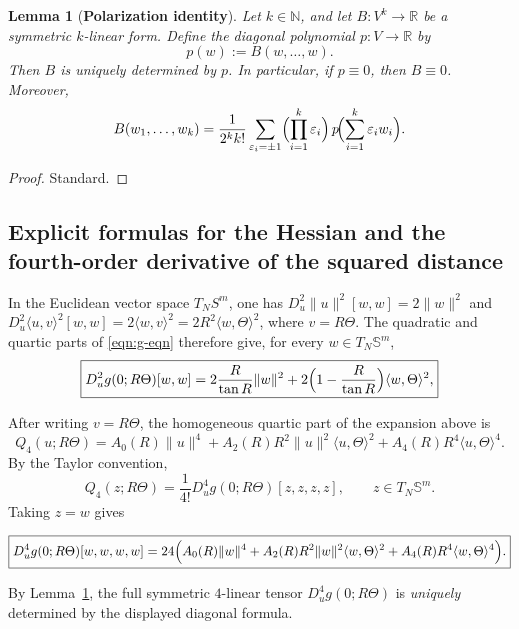\documentclass{amsart}
\newtheorem{lemma}[theorem]{Lemma}
\theoremstyle{definition}
\theoremstyle{remark}
\newcommand\0{\boldsymbol{0}}
\begin{document}
\begin{lemma}[\textbf{Polarization identity}]
\label{lem:polarization}
Let \(k\in\mathbb{N}\), and let \(B:V^k\to\mathbb{R}\) be a symmetric \(k\)-linear form.  Define the diagonal polynomial \(p:V\to\mathbb{R}\) by
\[
p(w):=B(w,\dots,w).
\]
Then \(B\) is uniquely determined by \(p\).  In particular, if \(p\equiv0\), then \(B\equiv0\).  Moreover,
\[
B(w_1,\dots,w_k)
=\frac{1}{2^k k!}\sum_{\varepsilon_i=\pm 1}
\Bigl(\prod_{i=1}^k \varepsilon_i\Bigr)\,
p\!\Bigl(\sum_{i=1}^k \varepsilon_i w_i\Bigr).
\]
\end{lemma}
\begin{proof}
    Standard.
\end{proof}

\subsection{Explicit formulas for the Hessian and the fourth-order derivative of the squared distance}
In the Euclidean vector space \(T_NS^m\), one has
\(D^2_u\|u\|^2[w,w]=2\|w\|^2\) and
\(D^2_u\langle u,v\rangle^2[w,w]=2\langle w,v\rangle^2
=2R^2\langle w,\Theta\rangle^2\), where \(v=R\Theta\).
The quadratic and quartic parts of \eqref{eqn:g-eqn} therefore give, for every \(w\in T_N\mathbb S^m\),
\begin{equation}\label{eqn:Hess-g}
\boxed{
 D_u^2 g(0;R\Theta)[w,w]
=
2\frac{R}{\tan R}\|w\|^2
+
2\Bigl(1-\frac{R}{\tan R}\Bigr)\langle w,\Theta\rangle^2, 
}
\end{equation}


After writing \(v=R\Theta\), the homogeneous quartic part of the expansion above is
\[
    Q_4(u;R\Theta)
    =
    A_0(R)\|u\|^4
    +
    A_2(R)R^2\|u\|^2\langle u,\Theta\rangle^2
    +
    A_4(R)R^4\langle u,\Theta\rangle^4 .
\]
By the Taylor convention,
\[
    Q_4(z;R\Theta)
    =
    \frac{1}{4!}D_u^4g(0;R\Theta)[z,z,z,z],
    \qquad z\in T_N\mathbb S^m .
\]
Taking \(z=w\) gives

\begin{equation}\label{eqn:fourth-derivative-g}
\boxed{
   D_u^4 g(0;R\Theta)[w,w,w,w]
=
24\Bigl(
A_0(R)\|w\|^4
+
A_2(R)R^2\|w\|^2\langle w,\Theta\rangle^2
+
A_4(R)R^4\langle w,\Theta\rangle^4
\Bigr). 
}
\end{equation}


By Lemma~\ref{lem:polarization}, the full symmetric \(4\)-linear tensor \(D_u^4 g(0;R\Theta)\) is \textit{uniquely} determined by the displayed diagonal formula.

\end{document}
